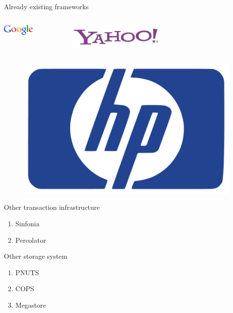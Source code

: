 \documentclass{beamer}
\begin{document}
		\begin{frame}{Already existing frameworks}
	


		
	
	\begin{columns}
	\begin{column}[1]{5cm}
	\includegraphics[width=0.5\textwidth]{img/fig:google}
	\end{column}
	\begin{column}[1]{5cm}
	\includegraphics[width=0.5\textwidth]{img/fig:yahoo}
	\end{column}
	\end{columns}
		
		
		\begin{figure} [H]
			\centering
			\includegraphics[scale=0.20]{img/fig:hp}
		\end{figure}				

			Other transaction infrastructure					
		
			\begin{enumerate}
			\item Sinfonia
			\item Percolator
			\end{enumerate}						
					
			Other storage system
			\begin{enumerate}
			\item PNUTS
			\item COPS
			\item Megastore
			\end{enumerate}		

		\end{frame}
	
\end{document}
